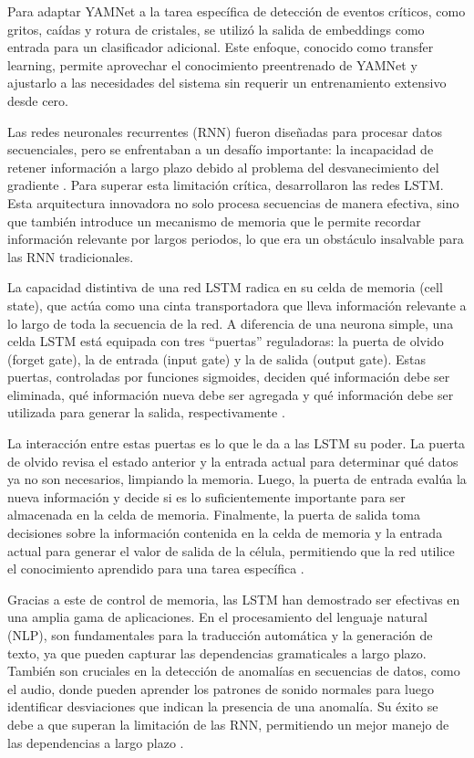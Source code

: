 Para adaptar YAMNet a la tarea específica de detección de eventos críticos, como gritos, caídas y rotura de cristales, se utilizó la salida de embeddings como entrada para un clasificador adicional. Este enfoque, conocido como transfer learning, permite aprovechar el conocimiento preentrenado de YAMNet y ajustarlo a las necesidades del sistema sin requerir un entrenamiento extensivo desde cero.


Las redes neuronales recurrentes (RNN) fueron diseñadas para procesar datos secuenciales, pero se enfrentaban a un desafío importante: la incapacidad de retener información a largo plazo debido al problema del desvanecimiento del gradiente \cite{heaton2018ian}. Para superar esta limitación crítica, \citeauthor{hochreiter1997long} \citeyear{hochreiter1997long} desarrollaron las redes LSTM. Esta arquitectura innovadora no solo procesa secuencias de manera efectiva, sino que también introduce un mecanismo de memoria que le permite recordar información relevante por largos periodos, lo que era un obstáculo insalvable para las RNN tradicionales.

La capacidad distintiva de una red LSTM radica en su celda de memoria (cell state), que actúa como una cinta transportadora que lleva información relevante a lo largo de toda la secuencia de la red. A diferencia de una neurona simple, una celda LSTM está equipada con tres ``puertas'' reguladoras: la puerta de olvido (forget gate), la de entrada (input gate) y la de salida (output gate). Estas puertas, controladas por funciones sigmoides, deciden qué información debe ser eliminada, qué información nueva debe ser agregada y qué información debe ser utilizada para generar la salida, respectivamente \cite{heaton2018ian}.

La interacción entre estas puertas es lo que le da a las LSTM su poder. La puerta de olvido revisa el estado anterior y la entrada actual para determinar qué datos ya no son necesarios, limpiando la memoria. Luego, la puerta de entrada evalúa la nueva información y decide si es lo suficientemente importante para ser almacenada en la celda de memoria. Finalmente, la puerta de salida toma decisiones sobre la información contenida en la celda de memoria y la entrada actual para generar el valor de salida de la célula, permitiendo que la red utilice el conocimiento aprendido para una tarea específica \cite{heaton2018ian}.

Gracias a este de control de memoria, las LSTM han demostrado ser efectivas en una amplia gama de aplicaciones. En el procesamiento del lenguaje natural (NLP), son fundamentales para la traducción automática y la generación de texto, ya que pueden capturar las dependencias gramaticales a largo plazo. También son cruciales en la detección de anomalías en secuencias de datos, como el audio, donde pueden aprender los patrones de sonido normales para luego identificar desviaciones que indican la presencia de una anomalía. Su éxito se debe a que superan la limitación de las RNN, permitiendo un mejor manejo de las dependencias a largo plazo \cite{hochreiter1997long}.

